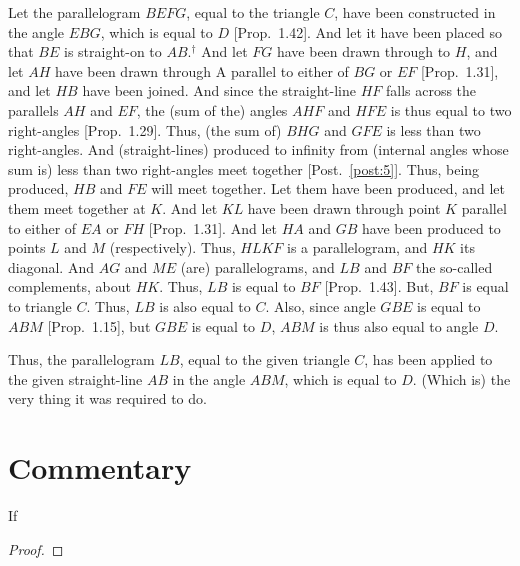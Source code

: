 Let the parallelogram $BEFG$, equal to the triangle $C$, have been
constructed in the angle $EBG$, which is equal to $D$ [Prop.~1.42].
And let it have been placed so that $BE$ is straight-on to $AB$.$^\dag$  And
let $FG$ have been drawn through to $H$, and let $AH$ have been
drawn through A parallel to either of $BG$ or $EF$ [Prop.~1.31], and
let $HB$ have been joined. And since the straight-line $HF$ falls across the
parallels $AH$ and $EF$, the (sum of the) angles $AHF$ and $HFE$ is thus equal to
two right-angles [Prop.~1.29]. Thus, (the sum of) $BHG$ and $GFE$ is less than two
right-angles.
And (straight-lines) produced to
infinity from (internal angles whose sum is) less than two right-angles meet together [Post.~\ref{post:5}].
Thus, being produced, $HB$ and $FE$ will meet together. Let them have
been produced, and let them meet together at $K$. And let $KL$ have been
drawn through point $K$ parallel to either of $EA$ or $FH$ [Prop.~1.31]. And
let $HA$ and $GB$ have been produced to points $L$ and $M$ (respectively). Thus, $HLKF$ is a parallelogram, and $HK$ its diagonal. And $AG$ and $ME$ (are) parallelograms, and $LB$ and $BF$ the so-called complements, about $HK$. Thus, $LB$ is
equal to $BF$ [Prop.~1.43]. But, $BF$ is equal to triangle $C$. Thus, $LB$ is also
equal to $C$. Also, since angle $GBE$ is equal to $ABM$ [Prop.~1.15], but
$GBE$ is equal to $D$, $ABM$ is thus also equal to angle $D$.

Thus, the parallelogram $LB$, equal to the
given triangle $C$, has been applied to the given straight-line
$AB$ in the angle $ABM$, which is equal to $D$. (Which is) the very thing it was required to do.


\section*{Commentary}

\begin{proposition}\label{proposition_44}\leanok
    If
\end{proposition}
\begin{proof}
    \leanok
\end{proof}
